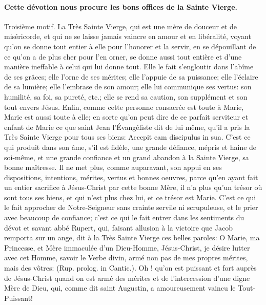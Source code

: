 \paragraph{Cette dévotion nous procure les bons offices de la Sainte Vierge.}
 Troisième motif. La Très Sainte Vierge, qui est une mère de douceur et de miséricorde, et qui ne se laisse
jamais vaincre en amour et en libéralité, voyant qu'on se donne tout entier à elle pour l'honorer et la servir, en se
dépouillant de ce qu'on a de plus cher pour l'en orner, se donne aussi tout entière et d'une manière ineffable à
celui qui lui donne tout. Elle le fait s'engloutir dans l'abîme de ses grâces; elle l'orne de ses mérites; elle l'appuie de
sa puissance; elle l'éclaire de sa lumière; elle l'embrase de son amour; elle lui communique ses vertus: son
humilité, sa foi, sa pureté, etc.; elle se rend sa caution, son supplément et son tout envers Jésus. Enfin, comme
cette personne consacrée est toute à Marie, Marie est aussi toute à elle; en sorte qu'on peut dire de ce parfait
serviteur et enfant de Marie ce que saint Jean l'Évangéliste dit de lui même, qu'il a pris la Très Sainte Vierge pour
tous ses biens: Accepit eam discipulus in sua.
 C'est ce qui produit dans son âme, s'il est fidèle, une grande défiance, mépris et haine de soi-même, et une
grande confiance et un grand abandon à la Sainte Vierge, sa bonne maîtresse. Il ne met plus, comme auparavant,
son appui en ses dispositions, intentions, mérites, vertus et bonnes oeuvres, parce qu'en ayant fait un entier
sacrifice à Jésus-Christ par cette bonne Mère, il n'a plus qu'un trésor où sont tous ses biens, et qui n'est plus chez
lui, et ce trésor est Marie. C'est ce qui le fait approcher de Notre-Seigneur sans crainte servile ni scrupuleuse, et le
prier avec beaucoup de confiance; c'est ce qui le fait entrer dans les sentiments du dévot et savant abbé Rupert,
qui, faisant allusion à la victoire que Jacob remporta sur un ange, dit à la Très Sainte Vierge ces belles paroles: O
Marie, ma Princesse, et Mère immaculée d'un Dieu-Homme, Jésus-Christ, je désire lutter avec cet Homme, savoir
le Verbe divin, armé non pas de mes propres mérites, mais des vôtres: 
(Rup. prolog. in Cantic.).
Oh ! qu'on est puissant et fort auprès de Jésus-Christ quand on est armé des mérites et de l'intercession d'une
digne Mère de Dieu, qui, comme dit saint Augustin, a amoureusement vaincu le Tout-Puissant!
